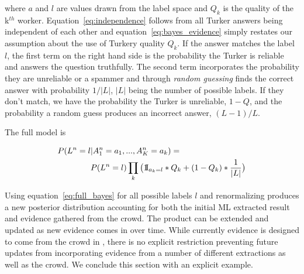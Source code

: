 where $a$ and $l$ are values drawn from the label space and $Q_{k}$ is the quality of the k$^{th}$ worker.  Equation~\ref{eq:independence} follows from all Turker answers being independent of each other and equation~\ref{eq:bayes_evidence} simply restates our assumption about the use of Turkery quality $Q_{k}$.  If the answer matches the label $l$, the first term on the right hand side is the probability the Turker is reliable and answers the question truthfully.  The second term incorporates the probability they are unreliable or a spammer and through \textit{random guessing} finds the correct answer with probability $1/|L|$, $|L|$ being the number of possible labels.  If they don't match, we have the probability the Turker is unreliable, $1-Q$, and the probability a random guess produces an incorrect answer, $(L-1)/L$.
 
The full model is

\begin{align}
\label{eq:full_bayes}
P(L^{n}=l&|A^{n}_{1}=a_{1},...,A^{n}_{K}=a_{k}) = \nonumber\\
                 &P(L^{n}=l)\prod_{k}\big(1{\hskip -2.5 pt}\hbox{I}_{{a_{k}}=l} *Q_{k}  + (1-Q_{k})*\frac{1}{|L|}\big)
\end{align}

Using equation~\ref{eq:full_bayes} for all possible labels $l$ and renormalizing produces a new posterior distribution accounting for both the initial ML extracted result and evidence gathered from the crowd.  The product can be extended and updated as new evidence comes in over time.  While currently evidence is designed to come from the crowd in \sysName , there is no explicit restriction preventing future updates from incorporating evidence from a number of different extractions as well as the crowd.  We conclude this section with an explicit example.

